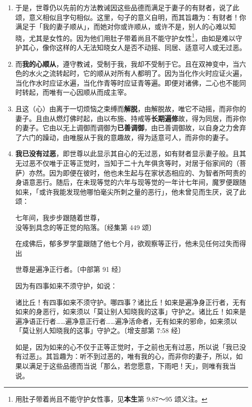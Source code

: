 \begin{enumerate}\item 于是，世尊仍以先前的方法教诫因这些品德而满足于妻子的有财者，说了此颂，意义相似且字句相似。这里，句子的意义自明，而其旨趣为：有财者！你满足于「我的妻子顺从」，而她对你或许顺从，或许不是，别人的心难以知晓，尤其是女性的。因为他们用肚子带着尚且不能守护女性\footnote{用肚子带着尚且不能守护女性事，见\textbf{本生}第 9:87～95 颂义注。}，由如是难以守护其心，像你这样的人无法知晓女人是否不动摇、同居、适意可人或无过恶。
\item 而\textbf{我的心顺从}，遵守教诫，受制于我，我却不受制于它。且在双神变中，当六色的水火之流转起时，它的顺从对所有人都明了。因为当化作火时应证火遍，当化作水时应证水遍，当化作青等时应证青等遍。即便对诸佛，二心也不能同时转起，而唯有一心因顺从而成主宰。
\item 且这（心）由离于一切烦恼之束缚而\textbf{解脱}，由解脱故，唯它不动摇，而非你的妻子。且由从燃灯佛时起，由以布施、持戒等\textbf{长期遍修}故，得为同居，而非你的妻子。它由以无上调御而调御为\textbf{已善调御}，由已善调御故，以自身之力舍弃了六门的躁动，由唯服从于我的意趣故，得为适意可人，而非你的妻子。
\item \textbf{我已没有过恶}，即世尊以此显示其自心的无过恶，如有财者显示妻子般。且其无过恶不仅唯于正等正觉时，当知于二十九年俱贪等时，对居于俗家间的（菩萨）亦然。因为即便在彼时，他也未生起与在家状态相应的、为智者所呵责的身语意恶行。随后，在未现等觉的六年与现等觉的一年计七年间，魔罗便跟随如来，「或许我能发现他哪怕毫尖所刺之量的恶行」，他未曾见而生厌，说了此颂：\begin{quoting}七年间，我步步跟随着世尊，\\没等到具念的等正觉的陷落。{\bluefootnotesize 〔经集第 449 颂〕}\end{quoting}在成佛后，郁多罗学童跟随了他七个月，欲观察等正行，他未见任何过失而得出\begin{quoting}世尊是遍净正行者。{\bluefootnotesize 〔中部第 91 经〕}\end{quoting}因为有四事如来不须守护，如说：\begin{quoting}诸比丘！有四事如来不须守护。哪四事？诸比丘！如来是遍净身正行者，无有如来的身恶行，如来须以「莫让别人知晓我的这事」守护之。诸比丘！如来是遍净语正行者……遍净意正行者……遍净活命者，无有如来的邪命，如来须以「莫让别人知晓我的这事」守护之。{\bluefootnotesize 〔增支部第 7:58 经〕}\end{quoting}如是，因为如来的心不仅于正等正觉时，于之前也无有过恶，所以说「我已没有过恶」。其旨趣为：听不到过恶的，唯有我的心，而非你的妻子，所以，如果以满足于这些品德而当说「那么，若您愿意，下雨吧！天」，则唯有我当说。\end{enumerate}

